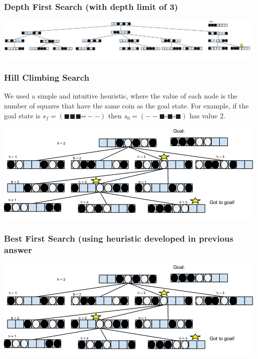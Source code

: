\documentclass[a4paper]{article}
\newcommand{\coinblack}{\blacksquare}
\newcommand{\coinwhite}{\square}
\newcommand{\coinempty}{-}
\begin{document}
\subsubsection{Depth First Search (with depth limit of 3)}
\begin{center}
\includegraphics[width=1\textwidth]{DFS.png}
\end{center}


\subsubsection{Hill Climbing Search}
We used a simple and intuitive heuristic, where the value of each node is the number of squares that have the same coin as the goal state.
For example, if the goal state is $s_f = (\coinblack \coinblack \coinblack \coinwhite \coinwhite \coinempty \coinempty)$ then $s_0 = (\coinempty \coinempty \coinblack \coinwhite \coinblack \coinwhite \coinblack)$ has value 2.
\begin{center}
\includegraphics[width=1\textwidth]{HillClimbing.png}
\end{center}

\subsubsection{Best First Search (using heuristic developed in previous answer}
\begin{center}
\includegraphics[width=1\textwidth]{BestFirst.png}
\end{center}
\end{document}
